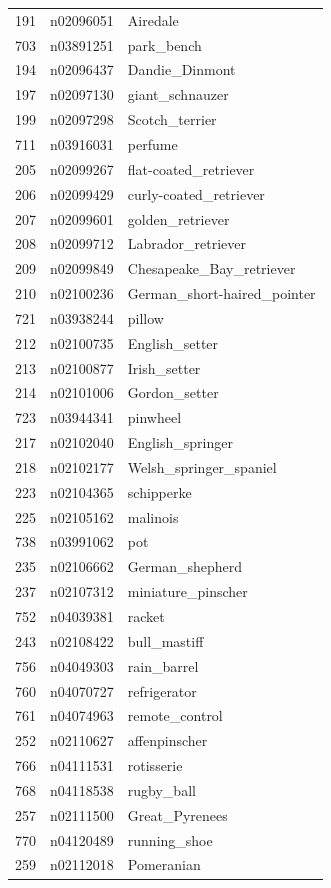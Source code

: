 \begin{table}
\begin{tabular}{cll}
191 & n02096051 & Airedale \\
703 & n03891251 & park_bench \\
194 & n02096437 & Dandie_Dinmont \\
197 & n02097130 & giant_schnauzer \\
199 & n02097298 & Scotch_terrier \\
711 & n03916031 & perfume \\
205 & n02099267 & flat-coated_retriever \\
206 & n02099429 & curly-coated_retriever \\
207 & n02099601 & golden_retriever \\
208 & n02099712 & Labrador_retriever \\
209 & n02099849 & Chesapeake_Bay_retriever \\
210 & n02100236 & German_short-haired_pointer \\
721 & n03938244 & pillow \\
212 & n02100735 & English_setter \\
213 & n02100877 & Irish_setter \\
214 & n02101006 & Gordon_setter \\
723 & n03944341 & pinwheel \\
217 & n02102040 & English_springer \\
218 & n02102177 & Welsh_springer_spaniel \\
223 & n02104365 & schipperke \\
225 & n02105162 & malinois \\
738 & n03991062 & pot \\
235 & n02106662 & German_shepherd \\
237 & n02107312 & miniature_pinscher \\
752 & n04039381 & racket \\
243 & n02108422 & bull_mastiff \\
756 & n04049303 & rain_barrel \\
760 & n04070727 & refrigerator \\
761 & n04074963 & remote_control \\
252 & n02110627 & affenpinscher \\
766 & n04111531 & rotisserie \\
768 & n04118538 & rugby_ball \\
257 & n02111500 & Great_Pyrenees \\
770 & n04120489 & running_shoe \\
259 & n02112018 & Pomeranian \\

\end{tabular}
\end{table}
